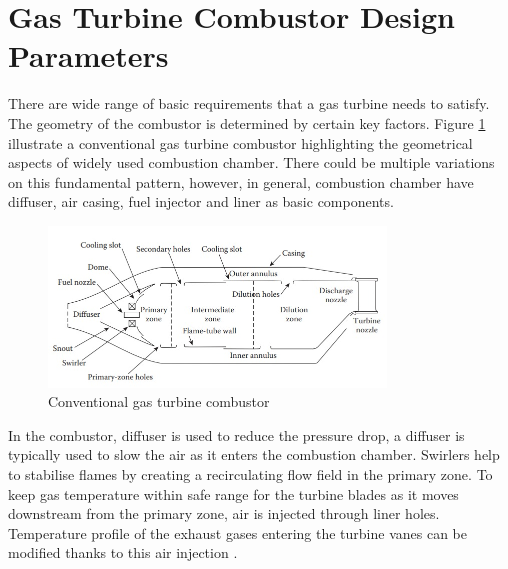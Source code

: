 \section{Gas Turbine Combustor Design Parameters}
There are wide range of basic requirements that a gas turbine needs to satisfy. The geometry of the combustor is determined by certain key factors. Figure \ref{fig:gasTurbineEngine} illustrate a conventional gas turbine combustor highlighting the geometrical aspects of widely used combustion chamber. There could be multiple variations on this fundamental pattern, however, in general, combustion chamber have diffuser, air casing, fuel injector and liner as basic components.
\begin{figure}[ht]
	\centering
	\includegraphics[width=0.8\textwidth]{Chapter1/Images/Conventional combustor.jpeg}
	\caption[Conventional gas turbine combustor.]{Conventional gas turbine combustor \cite{LTY2013}}
	\label{fig:gasTurbineEngine}
\end{figure}

In the combustor, diffuser is used to  reduce the pressure drop, a diffuser is typically used to slow the air as it enters the combustion chamber. Swirlers help to stabilise flames by creating a recirculating flow field in the primary zone. To keep gas temperature within safe range for the turbine blades as it moves downstream from the primary zone, air is injected through liner holes. Temperature profile of the exhaust gases entering the turbine vanes can be modified thanks to this air injection \cite{LAH2010}.

